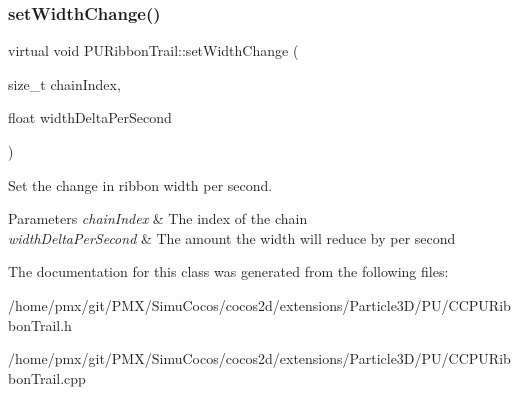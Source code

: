 \subsubsection{\texorpdfstring{set\+Width\+Change()}{setWidthChange()}\hspace{0.1cm}{\footnotesize\ttfamily [2/2]}}
{\footnotesize\ttfamily virtual void P\+U\+Ribbon\+Trail\+::set\+Width\+Change (\begin{DoxyParamCaption}\item[{size\+\_\+t}]{chain\+Index,  }\item[{float}]{width\+Delta\+Per\+Second }\end{DoxyParamCaption})\hspace{0.3cm}{\ttfamily [virtual]}}

Set the change in ribbon width per second. 
\begin{DoxyParams}{Parameters}
{\em chain\+Index} & The index of the chain \\
\hline
{\em width\+Delta\+Per\+Second} & The amount the width will reduce by per second \\
\hline
\end{DoxyParams}


The documentation for this class was generated from the following files\+:\begin{DoxyCompactItemize}
\item 
/home/pmx/git/\+P\+M\+X/\+Simu\+Cocos/cocos2d/extensions/\+Particle3\+D/\+P\+U/C\+C\+P\+U\+Ribbon\+Trail.\+h\item 
/home/pmx/git/\+P\+M\+X/\+Simu\+Cocos/cocos2d/extensions/\+Particle3\+D/\+P\+U/C\+C\+P\+U\+Ribbon\+Trail.\+cpp\end{DoxyCompactItemize}
